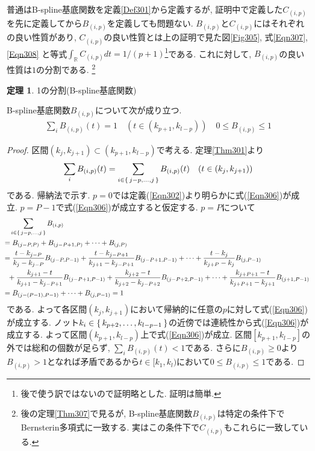 \documentclass{jsarticle}
\newcommand\setR{\mathbb{R}}
\newcommand\sfrac[2]{#1/#2}
\theoremstyle{definition}%
\newtheorem{thm}{定理}
\begin{document}
\newpage
普通はB-spline基底関数を定義\ref{Def301}から定義するが, 証明中で定義した$C_{(i,p)}$を先に定義してから$B_{(i,p)}$を定義しても問題ない.
$B_{(i,p)}$と$C_{(i,p)}$にはそれぞれの良い性質があり, $C_{(i,p)}$の良い性質とは上の証明で見た図\ref{Fig305}, 式\eqref{Eqn307}, \eqref{Eqn308} と等式$\int_\setR C_{(i,p)}dt=\sfrac{1}{(p+1)}$\footnote{後で使う訳ではないので証明略とした. 証明は簡単.}である.
これに対して, $B_{(i,p)}$の良い性質は$1$の分割である.%
\footnote{後の定理\ref{Thm307}で見るが, B-spline基底関数$B_{(i,p)}$は特定の条件下でBernsterin多項式に一致する. 実はこの条件下で$C_{(i,p)}$もこれらに一致している.}
\begin{screen}
	\begin{thm}
		\label{Thm306}
		1の分割(B-spline基底関数)

        B-spline基底関数$B_{(i,p)}$について次が成り立つ.
		\begin{align}
			\label{Eqn306}
			\sum_i B_{(i,p)}(t)= 1\quad (t\in(k_{p+1}, k_{l-p})) \quad 0\leq B_{(i,p)}\leq 1
		\end{align}
	\end{thm}
\end{screen}
\begin{proof}
	区間$(k_j,k_{j+1})\subset(k_{p+1},k_{l-p})$で考える.
	定理\ref{Thm301}より
	\begin{align}
		\sum_iB_{(i,p)}(t)
        =\sum_{i\in\set{j-p,\dots,j}}B_{(i,p)}(t)
        \quad (t\in(k_j,k_{j+1}))
	\end{align}
	である.
	帰納法で示す.
	$p=0$では定義(\ref{Eqn302})より明らかに式(\ref{Eqn306})が成立.
	$p=P-1$で式(\ref{Eqn306})が成立すると仮定する.
	$p=P$について
	\begin{align}
		\hspace{-0.78em}
		\begin{aligned}
			&\quad \sum_{i\in\set{j-p,\dots,j}}B_{(i,p)} \\
			&=B_{(j-P,P)}+B_{(j-P+1,P)}+\dots +B_{(j,P)} \\
			&=\frac{t-k_{j-P}}{k_{j}-k_{j-P}}B_{(j-P,P-1)}+\frac{t-k_{j-P+1}}{k_{j+1}-k_{j-P+1}}B_{(j-P+1,P-1)}+\dots+\frac{t-k_{j}}{k_{j+P}-k_{j}}B_{(j,P-1)} \\
			&\ \ +\frac{k_{j+1}-t}{k_{j+1}-k_{j-P+1}}B_{(j-P+1,P-1)}+\frac{k_{j+2}-t}{k_{j+2}-k_{j-P+2}}B_{(j-P+2,P-1)}+\dots+\frac{k_{j+P+1}-t}{k_{j+P+1}-k_{j+1}}B_{(j+1,P-1)}\\
			&=B_{(j-(P-1),P-1)}+\dots+B_{(j,P-1)}
			=1
		\end{aligned}
	\end{align}
	である.
	よって各区間$(k_j,k_{j+1})$において帰納的に任意の$p$に対して式(\ref{Eqn306})が成立する.
	ノット$k_{i}\in\set{k_{p+2},\dots,k_{l-p-1}}$の近傍では連続性から式(\ref{Eqn306})が成立する.
	よって区間$(k_{p+1}, k_{l-p})$上で式(\ref{Eqn306})が成立.
	区間$[k_{p+1},k_{l-p}]$の外では総和の個数が足らず, $\sum\limits_iB_{(i,p)}(t)<1$である.
	さらに$B_{(i,p)}\geq 0$より$B_{(i,p)}>1$となれば矛盾であるから$t\in[k_1, k_l)$において$0\leq B_{(i,p)}\leq 1$である.
\end{proof}
\end{document}
